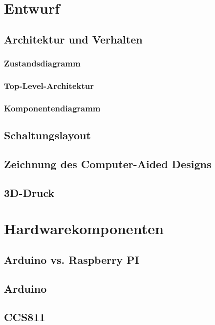 \documentclass[12pt,			%
a4paper,						%
twoside, 						%
listof=totoc, 					%
bibliography=totoc,				%
titlepage, 						%
headsepline, 					%
DIV18,							%
BCOR6mm,						%
cleardoublepage=empty,			%
parskip,						%
ngerman							%
]{scrbook}
\begin{document}
\chapter{Entwurf}

\section{Architektur und Verhalten}

\subsection{Zustandsdiagramm}

\subsection{Top-Level-Architektur}

\subsection{Komponentendiagramm}

\section{Schaltungslayout}

\section{Zeichnung des Computer-Aided Designs}

\section{3D-Druck}


\chapter{Hardwarekomponenten}

\section{Arduino vs. Raspberry PI}

\section{Arduino}

\section{CCS811}

\end{document}
